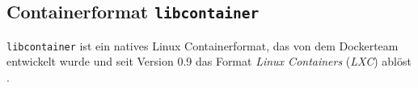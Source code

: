 \documentclass[../main.tex]{subfiles}
\begin{document}
    \subsection{Containerformat \texttt{libcontainer}}
      \texttt{libcontainer} ist ein natives Linux Containerformat, das von dem Dockerteam entwickelt wurde und seit Version 0.9 das Format \emph{Linux Containers} (\emph{LXC}) ablöst \cite{dockerSec1}.

\end{document}
